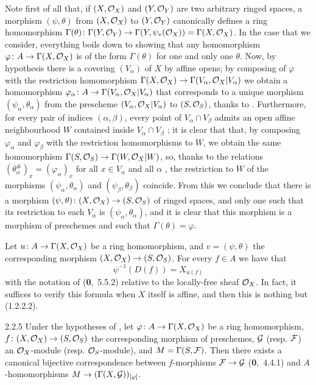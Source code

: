 Note first of all that, if $(X,\mathcal{O}_X)$ and $(Y,\mathcal{O}_Y)$ are two arbitrary ringed spaces,
a morphism $(\psi,\theta)$ from $(X,\mathcal{O}_X)$ to $(Y,\mathcal{O}_Y)$ canonically defines a ring
homomorphism
$\Gamma(\theta)\colon\Gamma(Y,\mathcal{O}_Y)\to\Gamma(Y,\psi_\ast(\mathcal{O}_X))=\Gamma(X,\mathcal{O}_X)$.
In the case that we consider, everything boils down to showing that any
homomorphism $\varphi\colon A\to\Gamma(X,\mathcal{O}_X)$ is of the form $\Gamma(\theta)$
for one and only one $\theta$. Now, by hypothesis there is a covering
$(V_\alpha)$ of $X$ by affine opens; by composing of $\varphi$ with the
restriction homomorphism $\Gamma(X,\mathcal{O}_X)\to\Gamma(V_\alpha,\mathcal{O}_X|V_\alpha)$ we
obtain a homomorphism $\varphi_\alpha\colon A\to\Gamma(V_\alpha,\mathcal{O}_X|V_\alpha)$
that corresponds to a unique morphism $(\psi_\alpha,\theta_\alpha)$ from the
prescheme $(V_\alpha,\mathcal{O}_X|V_\alpha)$ to $(S,\mathcal{O}_S)$, thanks to .
Furthermore, for every pair of indices $(\alpha,\beta)$, every point of
$V_\alpha\cap V_\beta$ admits an open affine neighbourhood $W$ contained inside
$V_\alpha\cap V_\beta$ ; it is clear that that, by composing
$\varphi_\alpha$ and $\varphi_\beta$ with the restriction homomorphisms to $W$,
we obtain the same homomorphism $\Gamma(S,\mathcal{O}_S)\to\Gamma(W,\mathcal{O}_X|W)$, so, thanks
to the relations $(\theta_\alpha^\#)_x=(\varphi_\alpha)_x$ for all $x\in
V_\alpha$ and all $\alpha$ , the restriction to $W$ of the morphisms
$(\psi_\alpha,\theta_\alpha)$ and $(\psi_\beta,\theta_\beta)$ coincide. From
this we conclude that there is a morphism
$(\psi,\theta)\colon(X,\mathcal{O}_X)\to(S,\mathcal{O}_S)$ of ringed spaces, and only one such
that its restriction to each $V_\alpha$ is $(\psi_\alpha,\theta_\alpha)$, and it
is clear that this morphism is a morphism of preschemes and such that
$\Gamma(\theta)=\varphi$.

Let $u\colon A\to\Gamma(X,\mathcal{O}_X)$ be a ring homomorphism, and $v=(\psi,\theta)$
the corresponding morphism $(X,\mathcal{O}_X)\to(S,\mathcal{O}_S)$. For every $f\in A$ we have
that
\[
  \psi^{-1}(D(f))=X_{u(f)}\tag{2.2.4.1}
\]
with the notation of (\textbf{0},~5.5.2) relative to the locally-free sheaf
$\mathcal{O}_X$. In fact, it suffices to verify this formula when $X$ itself is affine,
and then this is nothing but (1.2.2.2).

\begin{env}[Proposition]{2.2.5}
Under the hypotheses of , let
$\varphi\colon A\to\Gamma(X,\mathcal{O}_X)$ be a ring homomorphism,
$f\colon(X,\mathcal{O}_X)\to(S,\mathcal{O}_S)$ the corresponding morphism of preschemes,
$\mathcal{G}$ (resp. $\mathcal{F}$) an $\mathcal{O}_X$-module (resp. $\mathcal{O}_S$-module), and
$M=\Gamma(S,\mathcal{F})$. Then there exists a canonical bijective
correspondence between $f$-morphisms $\mathcal{F}\to\mathcal{G}$
(\textbf{0},~4.4.1) and $A$-homomorphisms
$M\to(\Gamma(X,\mathcal{G}))_{[\varphi]}$.
\end{env}

